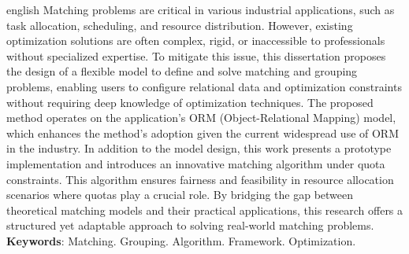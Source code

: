 
\begin{resumo}[Abstract]
  \begin{otherlanguage*}{english}
    Matching problems are critical in various industrial applications, such as task allocation, scheduling, and resource distribution.
    However, existing optimization solutions are often complex, rigid, or inaccessible to professionals without specialized expertise.
    To mitigate this issue, this dissertation proposes the design of a flexible model to define and solve matching and grouping problems, enabling users to configure relational data and optimization constraints without requiring deep knowledge of optimization techniques.
    The proposed method operates on the application's ORM (Object-Relational Mapping) model, which enhances the method's adoption given the current widespread use of ORM in the industry.
    In addition to the model design, this work presents a prototype implementation and introduces an innovative matching algorithm under quota constraints.
    This algorithm ensures fairness and feasibility in resource allocation scenarios where quotas play a crucial role. By bridging the gap between theoretical matching models and their practical applications, this research offers a structured yet adaptable approach to solving real-world matching problems.  
    \textbf{Keywords}: Matching. Grouping. Algorithm. Framework. Optimization.
  \end{otherlanguage*}
\end{resumo}

